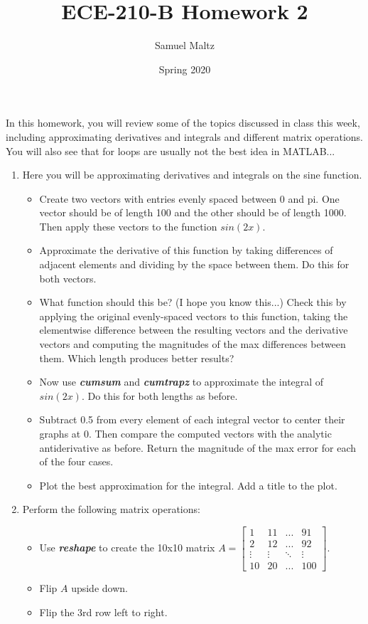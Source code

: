 \documentclass{article}
\title{ECE-210-B Homework 2}
\author{Samuel Maltz}
\date{Spring 2020}
\begin{document}
\noindent In this homework, you will review some of the topics discussed in class this week, including approximating derivatives and integrals and different matrix operations. You will also see that for loops are usually not the best idea in MATLAB...
\begin{enumerate}
\item Here you will be approximating derivatives and integrals on the sine function.
	\begin{itemize}
		\item Create two vectors with entries evenly spaced between 0 and pi. One vector should be of length 100 and the other should be of length 1000. Then apply these vectors to the function $sin(2x)$.
		\item Approximate the derivative of this function by taking differences of adjacent elements and dividing by the space between them. Do this for both vectors.
		\item What function should this be? (I hope you know this...) Check this by applying the original evenly-spaced vectors to this function, taking the elementwise difference between the resulting vectors and the derivative vectors and computing the magnitudes of the max differences between them. Which length produces better results?
		\item Now use \textbf{\textit{cumsum}} and \textbf{\textit{cumtrapz}} to approximate the integral of $sin(2x)$. Do this for both lengths as before.
		\item Subtract 0.5 from every element of each integral vector to center their graphs at 0.	Then compare the computed vectors with the analytic antiderivative as before. Return the magnitude of the max error for each of the four cases.
		\item Plot the best approximation for the integral. Add a title to the plot. 
	\end{itemize}
\item Perform the following matrix operations:
	\begin{itemize}
		\item Use \textbf{\textit{reshape}} to create the 10x10 matrix $A = \begin{bmatrix}1 &11 & ...& 91\\ 2&12&...&92\\ \vdots&\vdots&\ddots&\vdots\\ 10&20&...&100\end{bmatrix}$.
		\item Flip $A$ upside down.
		\item Flip the 3rd row left to right.

\end{itemize}
\end{enumerate}
\end{document}
